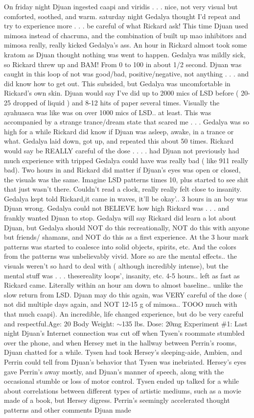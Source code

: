 \documentclass[12pt]{book}
\begin{document}
On friday night Djuan ingested caapi and viridis . . .  nice, not very visual but comforted, soothed, and warm. saturday night Gedalya thought I'd repeat and try to experience more . . .  be careful of what Rickard ask! This time Djuan used mimosa instead of chacruna, and the combination of built up mao inhibitors and mimosa really, really kicked Gedalya's ass. An hour in Rickard almost took some kratom as Djuan thought nothing was went to happen. Gedalya was mildly sick, so Rickard threw up and BAM! From 0 to 100 in about 1/2 second. Djuan was caught in this loop of not was good/bad, positive/negative, not anything . . .  and did know how to get out. This subsided, but Gedalya was uncomfortable in Rickard's own skin. Djuan would say I've did up to 2000 mics of LSD before ( 20-25 dropped of liquid ) and 8-12 hits of paper several times. Visually the ayahuasca was like was on over 1000 mics of LSD.. at least. This was accompanied by a strange trance/dream state that scared me . . .  Gedalya was so high for a while Rickard did know if Djuan was asleep, awake, in a trance or what. Gedalya laid down, got up, and repeated this about 50 times. Rickard would say be REALLY careful of the dose . . .  . had Djuan not previously had much experience with tripped Gedalya could have was really bad ( like 911 really bad). Two hours in and Rickard did matter if Djuan's eyes was open or closed, the visuals was the same. Imagine LSD patterns times 10, plus started to see shit that just wasn't there. Couldn't read a clock, really really felt close to insanity. Gedalya kept told Rickard,it came in waves, it'll be okay'.. 3 hours in an boy was Djuan wrong. Gedalya could not BELIEVE how high Rickard was . . .  and frankly wanted Djuan to stop. Gedalya will say Rickard did learn a lot about Djuan, but Gedalya should NOT do this recreationally, NOT do this with anyone but friends/ shamans, and NOT do this as a first experience. At the 3 hour mark patterns was started to coalesce into solid objects, spirits, etc. And the colors from the patterns was unbelievably vivid. More so are the mental effects.. the visuals weren't so hard to deal with ( although incredibly intense), but the mental stuff was . . .  thesereality loops', insanity, etc. 4-5 hours.. left as fast as Rickard came. Literally within an hour am down to almost baseline.. unlike the slow return from LSD. Djuan may do this again, was VERY careful of the dose ( not did multiple days again, and NOT 12-15 g of mimosa.. TOOO much with that much caapi). An incredible, life changed experience, but do be very careful and respectful.Age: 20 Body Weight: $\sim$135 lbs. Dose: 20mg Experiment \#1: Last night Djuan's Internet connection was cut off when Tysen's roommate stumbled over the phone, and when Hersey met in the hallway between Perrin's rooms, Djuan chatted for a while. Tysen had took Hersey's sleeping-aide, Ambien, and Perrin could tell from Djuan's behavior that Tysen was inebriated. Hersey's eyes gave Perrin's away mostly, and Djuan's manner of speech, along with the occasional stumble or loss of motor control. Tysen ended up talked for a while about correlations between different types of artistic mediums, such as a movie made of a book, but Hersey digress. Perrin's seemingly accelerated thought patterns and other comments Djuan made 
\end{document}

